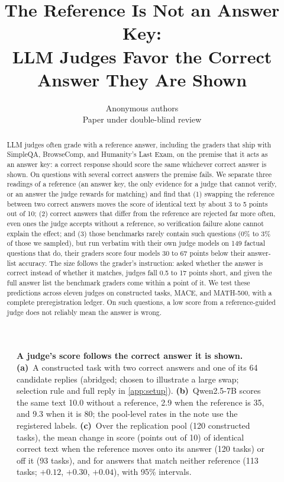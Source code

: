 \documentclass{article}
\title{The Reference Is Not an Answer Key:\\LLM Judges Favor the Correct Answer They Are Shown}
\author{Anonymous authors\\Paper under double-blind review}
\begin{document}
\maketitle
\raggedbottom

\begin{abstract}
LLM judges often grade with a reference answer, including the graders that ship with SimpleQA, BrowseComp, and Humanity's Last Exam, on the premise that it acts as an answer key: a correct response should score the same whichever correct answer is shown.
On questions with several correct answers the premise fails.
We separate three readings of a reference (an answer key, the only evidence for a judge that cannot verify, or an answer the judge rewards for matching) and find that (1) swapping the reference between two correct answers moves the score of identical text by about 3 to 5 points out of 10; (2) correct answers that differ from the reference are rejected far more often, even ones the judge accepts without a reference, so verification failure alone cannot explain the effect; and (3) those benchmarks rarely contain such questions (0\% to 3\% of those we sampled), but run verbatim with their own judge models on 149 factual questions that do, their graders score four models 30 to 67 points below their answer-list accuracy.
The size follows the grader's instruction: asked whether the answer is correct instead of whether it matches, judges fall 0.5 to 17 points short, and given the full answer list the benchmark graders come within a point of it.
We test these predictions across eleven judges on constructed tasks, MACE, and MATH-500, with a complete preregistration ledger.
On such questions, a low score from a reference-guided judge does not reliably mean the answer is wrong.
\end{abstract}

\begin{figure}[!b]
\centering
\resizebox{\textwidth}{!}{}
\caption{\textbf{A judge's score follows the correct answer it is shown.}
\textbf{(a)}~A constructed task with two correct answers and one of its 64 candidate replies (abridged; chosen to illustrate a large swap; selection rule and full reply in \cref{app:setup}).
\textbf{(b)}~Qwen2.5-7B scores the same text 10.0 without a reference, 2.9 when the reference is 35, and 9.3 when it is 80; the pool-level rates in the note use the registered labels.
\textbf{(c)}~Over the replication pool (120 constructed tasks), the mean change in score (points out of 10) of identical correct text when the reference moves onto its answer (120 tasks) or off it (93 tasks), and for answers that match neither reference (113 tasks; $+0.12$, $+0.30$, $+0.04$), with 95\% intervals.}
\label{fig:concept}
\end{figure}
\end{document}
